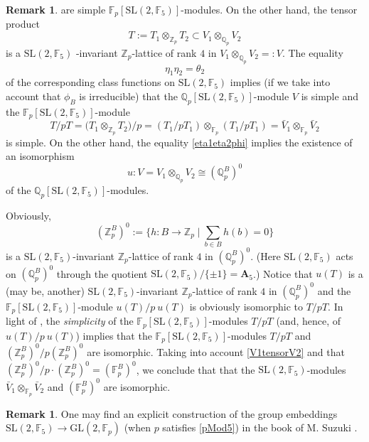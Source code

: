\documentclass[12pt,a4paper,reqno]{amsart}
\def\Q{{\mathbb Q}}
\def\Z{{\mathbb Z}}
\def\F{{\mathbb F}}
\def\GL{\mathrm{GL}}
\def\SL{\mathrm{SL}}
\theoremstyle{definition}
\newtheorem{rem}[thm]{Remark}
\begin{document}
\begin{rem}
are simple $\F_p[\mathrm{SL}(2,\F_5)]$-modules.
On the other hand, the tensor product
$$T:=T_1 \otimes_{\Z_p} T_2\subset V_1 \otimes_{\Q_p} V_2$$
 is a $\mathrm{SL}(2,\F_5)$ -invariant $\Z_p$-lattice of rank $4$ in $V_1\otimes_{\Q_p}V_2=:V$.
 The equality 
 \begin{equation}
 \label{eta1eta2phi}
 \eta_1 \eta_2=\theta_2
 \end{equation}
   of the corresponding class functions on  $\mathrm{SL}(2,\F_5)$ implies (if we take into account that $\phi_B$ is irreducible)
  that the $\Q_p[\mathrm{SL}(2,\F_5)]$-module
 $V$ is simple and the $\F_p[\mathrm{SL}(2,\F_5)]$-module
 \begin{equation}
 \label{V1tensorV2}
 T/pT=\big(T_1 \otimes_{\Z_p} T_2\big)/p= (T_1/pT_1)\otimes_{\F_p}(T_1/pT_1)=\bar{V}_1\otimes_{\F_p}\bar{V}_2
 \end{equation}
 is simple.   On the other hand, the equality \eqref{eta1eta2phi} implies the existence of an isomorphism
 $$u: V=V_1 \otimes_{\Q_p} V_2 \cong (\Q_p^{B})^0$$
 of the $\Q_p[\mathrm{SL}(2,\F_5)]$-modules. 
 
 Obviously, 
 $$(\Z_p^{B})^0:=\{h: B \to \Z_p\mid \sum_{b\in B}h(b)=0\}$$
 is  a $\mathrm{SL}(2,\F_5)$-invariant $\Z_p$-lattice of rank $4$ in $(\Q_p^{B})^0$.
 (Here $\mathrm{SL}(2,\F_5)$ acts on $(\Q_p^{B})^0$ through the quotient $\mathrm{SL}(2,\F_5)/\{\pm 1\}=\mathbf{A}_5$.)
 Notice that $u(T)$ is a (may be, another)   $\mathrm{SL}(2,\F_5)$-invariant $\Z_p$-lattice of rank $4$ in $(\Q_p^{B})^0$ and
 the $\F_p[\mathrm{SL}(2,\F_5)]$-module $u(T)/p \ u(T)$ is obviously isomorphic to $T/pT$.  In light of \cite[Sect. 15.1,  Th. 32]{SerreRep}, the {\sl simplicity} of  the $\F_p[\mathrm{SL}(2,\F_5)]$-modules
 $T/pT$ (and, hence, of $u(T)/p \ u(T)$) implies that the  $\F_p[\mathrm{SL}(2,\F_5)]$-modules $T/pT$ and $(\Z_p^{B})^0/p (\Z_p^{B})^0$ are isomorphic.
 Taking into account  \eqref{V1tensorV2} and  that $(\Z_p^{B})^0/p \cdot (\Z_p^{B})^0=(\F_p^{B})^0$, we conclude that
  that the $\mathrm{SL}(2,\F_5)$-modules
 $\bar{V}_1\otimes_{\F_p}\bar{V}_2$ and $(\F_p^{B})^0$ are isomorphic.
\end{rem}

\begin{rem}
One may find an explicit construction of the group embeddings $\SL(2,\F_5) \to \GL(2,\F_p)$ (when $p$ satisfies \eqref{pMod5})
in the book of M. Suzuki \cite[Ch.  3, Sect. 6]{Suzuki}.

\end{rem}
\end{document}
